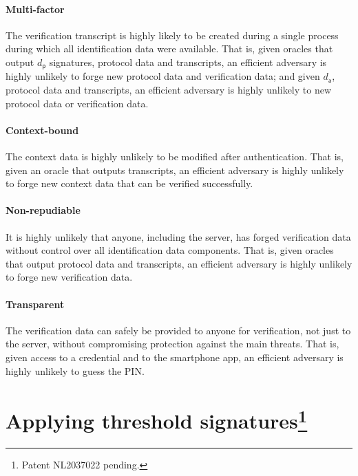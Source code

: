 \documentclass[a4paper]{article}
\begin{document}
\paragraph{Multi-factor}

The verification transcript is highly likely to be created during a single process during which all identification data were available. That is, given oracles that output $d_\mathsf{p}$ signatures, protocol data and transcripts, an efficient adversary is highly unlikely to forge new protocol data and verification data; and given $d_\mathsf{a}$, protocol data and transcripts, an efficient adversary is highly unlikely to new protocol data or verification data.

\paragraph{Context-bound}

The context data is highly unlikely to be modified after authentication. That is, given an oracle that outputs transcripts, an efficient adversary is highly unlikely to forge new context data that can be verified successfully.

\paragraph{Non-repudiable}

It is highly unlikely that anyone, including the server, has forged verification data without control over all identification data components. That is, given oracles that output protocol data and transcripts, an efficient adversary is highly unlikely to forge new verification data.

\paragraph{Transparent}

The verification data can safely be provided to anyone for verification, not just to the server, without compromising protection against the main threats. That is, given access to a credential and to the smartphone app, an efficient adversary is highly unlikely to guess the PIN.

\section{Applying threshold signatures\footnote{Patent NL2037022 pending.}}
\end{document}
